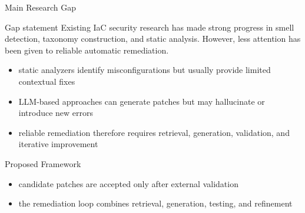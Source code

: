 \documentclass[aspectratio=169,10pt]{beamer}
\begin{document}
\begin{frame}{Main Research Gap}
\begin{block}{Gap statement}
Existing IaC security research has made strong progress in smell detection,
taxonomy construction, and static analysis. However, less attention has been
given to reliable automatic remediation.
\end{block}
\begin{itemize}
  \item static analyzers identify misconfigurations but usually provide limited contextual fixes
  \item LLM-based approaches can generate patches but may hallucinate or introduce new errors
  \item reliable remediation therefore requires retrieval, generation, validation, and iterative improvement
\end{itemize}
\end{frame}

\begin{frame}{Proposed Framework}
\centering
{}
\vspace{0.4cm}
\begin{itemize}
  \item candidate patches are accepted only after external validation
  \item the remediation loop combines retrieval, generation, testing, and refinement
\end{itemize}
\end{frame}
\end{document}
